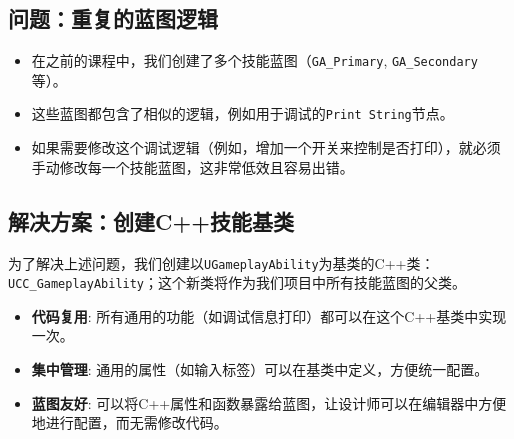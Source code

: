 \documentclass[10pt,CJKmath]{zhbook-v1}
\newcommand{\il}[1]{\texttt{#1}}%
\begin{document}
\subsection{问题：重复的蓝图逻辑}
\begin{itemize}
    \item 在之前的课程中，我们创建了多个技能蓝图（\texttt{GA\_Primary}, \texttt{GA\_Secondary}等）。
    \item 这些蓝图都包含了相似的逻辑，例如用于调试的\texttt{Print String}节点。
    \item 如果需要修改这个调试逻辑（例如，增加一个开关来控制是否打印），就必须手动修改每一个技能蓝图，这非常低效且容易出错。
\end{itemize}

\subsection{解决方案：创建C++技能基类}
为了解决上述问题，我们创建以\il{UGameplayAbility}为基类的C++类：\il{UCC_GameplayAbility}；这个新类将作为我们项目中所有技能蓝图的父类。
\begin{itemize}
    \item \textbf{代码复用}: 所有通用的功能（如调试信息打印）都可以在这个C++基类中实现一次。
    \item \textbf{集中管理}: 通用的属性（如输入标签）可以在基类中定义，方便统一配置。
    \item \textbf{蓝图友好}: 可以将C++属性和函数暴露给蓝图，让设计师可以在编辑器中方便地进行配置，而无需修改代码。
\end{itemize}
\end{document}

